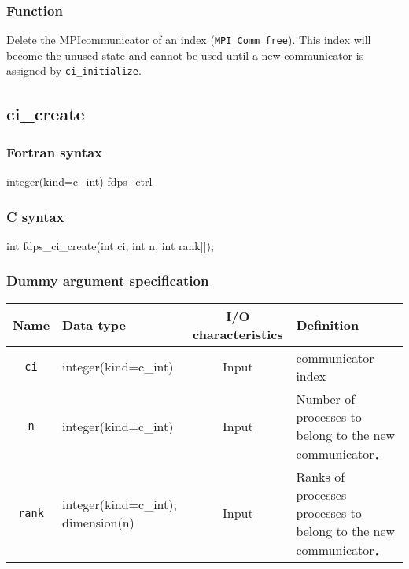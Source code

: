 \subsubsection*{Function}
Delete the MPIcommunicator of an index ({\tt MPI\_Comm\_free}).
This index will become the unused state and cannot be used until
a new communicator is assigned by {\tt ci\_initialize}.


\subsection{ci\_create}
\subsubsection*{Fortran syntax}
\begin{screen}
\begin{spverbatim}
integer(kind=c_int) fdps_ctrl%
\end{spverbatim}
\end{screen}

\subsubsection*{C syntax}
\begin{screen}
\begin{spverbatim}
int fdps_ci_create(int ci, int n, int rank[]);
\end{spverbatim}
\end{screen}

\subsubsection*{Dummy argument specification}
\begin{table}[h]
\begin{tabularx}{\linewidth}{cXcX}
\toprule
\rowcolor{Snow2}
Name & Data type & I/O characteristics & Definition \\
\midrule
\verb|ci| & integer(kind=c\_int) & Input & communicator index\\
\verb|n| & integer(kind=c\_int) & Input &Number of processes to belong
to the new communicator． \\
\verb|rank| & integer(kind=c\_int), dimension(n) & Input &Ranks of processes processes to belong to the new communicator．\\
\bottomrule
\end{tabularx}
\end{table}


